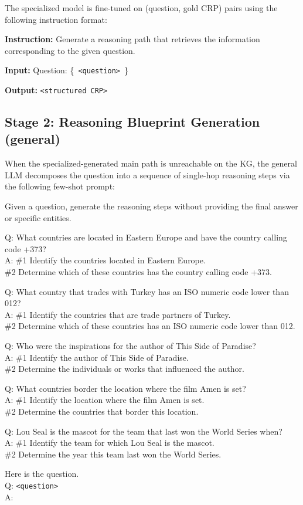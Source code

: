 \documentclass[11pt]{article}
\begin{document}
The specialized model is fine-tuned on (question, gold CRP) pairs using the following instruction format:

\begin{tcolorbox}[colback=gray!5, colframe=gray!60, title=CRP Generation Prompt, breakable]
\small
\textbf{Instruction:} Generate a reasoning path that retrieves the information corresponding to the given question.

\textbf{Input:} Question: \{~\texttt{<question>}~\}

\textbf{Output:} \texttt{<structured CRP>}
\end{tcolorbox}

\subsection{Stage 2: Reasoning Blueprint Generation (general)}
\label{app:prompt_blueprint}

When the specialized-generated main path is unreachable on the KG, the general LLM decomposes the question into a sequence of single-hop reasoning steps via the following few-shot prompt:

\begin{tcolorbox}[colback=gray!5, colframe=gray!60, title=Reasoning Blueprint Prompt, breakable]
\small
Given a question, generate the reasoning steps without providing the final answer or specific entities.

Q: What countries are located in Eastern Europe and have the country calling code +373?\\
A: \#1 Identify the countries located in Eastern Europe.\\
\#2 Determine which of these countries has the country calling code +373.

Q: What country that trades with Turkey has an ISO numeric code lower than 012?\\
A: \#1 Identify the countries that are trade partners of Turkey.\\
\#2 Determine which of these countries has an ISO numeric code lower than 012.

Q: Who were the inspirations for the author of This Side of Paradise?\\
A: \#1 Identify the author of This Side of Paradise.\\
\#2 Determine the individuals or works that influenced the author.

Q: What countries border the location where the film Amen is set?\\
A: \#1 Identify the location where the film Amen is set.\\
\#2 Determine the countries that border this location.

Q: Lou Seal is the mascot for the team that last won the World Series when?\\
A: \#1 Identify the team for which Lou Seal is the mascot.\\
\#2 Determine the year this team last won the World Series.

Here is the question.\\
Q: \texttt{<question>}\\
A:
\end{tcolorbox}
\end{document}
